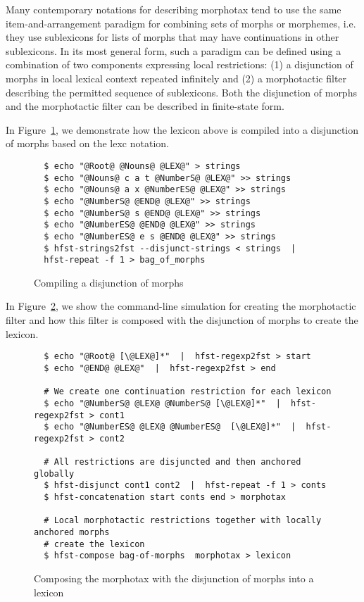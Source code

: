\documentclass{llncs}
\begin{document}
Many contemporary notations for describing morphotax tend to use the same item-and-arrangement paradigm for
combining sets of morphs or morphemes, i.e. they use sublexicons for lists of morphs that may 
have continuations in other sublexicons. 
In its most general form, such a paradigm can be defined using a combination of two components expressing local restrictions:
(1) a disjunction of morphs in local lexical context repeated infinitely and 
(2) a morphotactic filter describing the permitted sequence of sublexicons.
Both the disjunction of morphs and the morphotactic filter can be described in finite-state form.

In Figure~\ref{fig:morphology1}, we demonstrate how the lexicon above is compiled into a disjunction of 
morphs based on the lexc notation.

\begin{figure} [h]
{\footnotesize
\begin{verbatim}
  $ echo "@Root@ @Nouns@ @LEX@" > strings
  $ echo "@Nouns@ c a t @NumberS@ @LEX@" >> strings
  $ echo "@Nouns@ a x @NumberES@ @LEX@" >> strings
  $ echo "@NumberS@ @END@ @LEX@" >> strings
  $ echo "@NumberS@ s @END@ @LEX@" >> strings
  $ echo "@NumberES@ @END@ @LEX@" >> strings
  $ echo "@NumberES@ e s @END@ @LEX@" >> strings
  $ hfst-strings2fst --disjunct-strings < strings  | 
  hfst-repeat -f 1 > bag_of_morphs
\end{verbatim}
}
\caption{Compiling a disjunction of morphs}
\label{fig:morphology1}
\end{figure}

In Figure~\ref{fig:morphology2}, we show the command-line simulation for creating the morphotactic filter and how this filter is composed with the disjunction of morphs to create the lexicon. 

\begin{figure} [h!]
{\footnotesize
\begin{verbatim}
  $ echo "@Root@ [\@LEX@]*"  |  hfst-regexp2fst > start
  $ echo "@END@ @LEX@"  |  hfst-regexp2fst > end

  # We create one continuation restriction for each lexicon
  $ echo "@NumberS@ @LEX@ @NumberS@ [\@LEX@]*"  |  hfst-regexp2fst > cont1
  $ echo "@NumberES@ @LEX@ @NumberES@  [\@LEX@]*"  |  hfst-regexp2fst > cont2

  # All restrictions are disjuncted and then anchored globally
  $ hfst-disjunct cont1 cont2  |  hfst-repeat -f 1 > conts
  $ hfst-concatenation start conts end > morphotax

  # Local morphotactic restrictions together with locally anchored morphs 
  # create the lexicon
  $ hfst-compose bag-of-morphs  morphotax > lexicon
\end{verbatim}
}
\caption{Composing the morphotax with the disjunction of morphs into a lexicon}
\label{fig:morphology2}
\end{figure}
\end{document}
